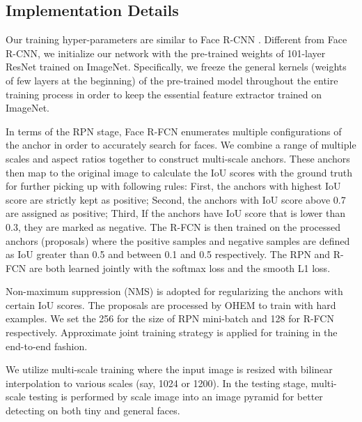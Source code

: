 \documentclass{article} %
\begin{document}


\subsection{Implementation Details}
Our training hyper-parameters are similar to Face R-CNN \cite{facercnn}. Different from Face R-CNN, we initialize our network with the pre-trained weights of 101-layer ResNet trained on ImageNet. Specifically, we freeze the general kernels (weights of few layers at the beginning) of the pre-trained model throughout the entire training process in order to keep the essential feature extractor trained on ImageNet. 

In terms of the RPN stage, Face R-FCN enumerates multiple configurations of the anchor in order to accurately search for faces. We combine a range of multiple scales and aspect ratios together to construct multi-scale anchors. These anchors then map to the original image to calculate the IoU scores with the ground truth for further picking up with following rules: First, the anchors with highest IoU score are strictly kept as positive; Second, the anchors with IoU score above 0.7 are assigned as positive; Third, If the anchors have IoU score that is lower than 0.3, they are marked as negative. The R-FCN is then trained on the processed anchors (proposals) where the positive samples and negative samples are defined as IoU greater than 0.5 and between 0.1 and 0.5 respectively. The RPN and R-FCN are both learned jointly with the softmax loss and the smooth L1 loss.

Non-maximum suppression (NMS) is adopted for regularizing the anchors with certain IoU scores. The proposals are processed by OHEM to train with hard examples. We set the 256 for the size of RPN mini-batch and 128 for R-FCN respectively. Approximate joint training strategy is applied for training in the end-to-end fashion.

We utilize multi-scale training where the input image is resized with bilinear interpolation to various scales (say, 1024 or 1200). In the testing stage, multi-scale testing is performed by scale image into an image pyramid for better detecting on both tiny and general faces.


\end{document}
